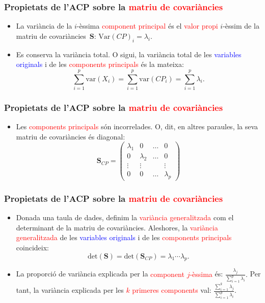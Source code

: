 \documentclass[12pt,t]{beamer}
\newcommand{\red}[1]{\textcolor{red}{#1}}
\newcommand{\blue}[1]{\textcolor{blue}{#1}}
\theoremstyle{plain}
\theoremstyle{definition}
\begin{document}
\begin{frame}
\frametitle{Propietats de l'ACP sobre la \red{matriu de covariàncies}}
\begin{itemize}
\item La variància de la $i$-èssima \red{component principal} és el \red{valor propi} $i$-èssim de la matriu de covariàncies~$\mathbf{S}$: $\mbox{Var} (CP)_i =\lambda_i.$
\item Es conserva la variància total. O sigui, la variància total de les \blue{variables originals} i de les \red{components principals} és la mateixa:
\[
\sum_{i=1}^p \mbox{var}(X_i) = \sum_{i=1}^p \mbox{var}(CP_i) =\sum_{i=1}^p\lambda_i.
\]

\end{itemize}
\end{frame}

\begin{frame}
\frametitle{Propietats de l'ACP sobre la \red{matriu de covariàncies}}
\begin{itemize}
\item Les \red{components principals} són incorrelades. O, dit, en altres paraules, la seva matriu de covariàncies és diagonal:
$$\mathbf{S}_{CP}=\left(\begin{array}{cccc}
\lambda_1& 0 &\ldots &  0\\
0& \lambda_{2}&\ldots & 0\\
\vdots & \vdots & & \vdots\\
0 & 0&\ldots &  \lambda_{p}
\end{array}
\right)$$

\end{itemize}
\end{frame}


\begin{frame}
\frametitle{Propietats de l'ACP sobre la \red{matriu de covariàncies}}
{\small
\begin{itemize}
\item Donada una taula de dades, definim la \red{variància generalitzada} com el determinant de la matriu de covariàncies. Aleshores, la \red{variància generalitzada} de les \blue{variables originals} i de les \red{components principals} coincideix:
\[
\mbox{det}(\mathbf{S}) =\mbox{det}(\mathbf{S}_{CP}) =\lambda_1\cdots \lambda_p.
\]
\item La proporció de variància explicada per la \red{component $j$-èssima} és: $\frac{\lambda_j}{\sum_{i=1}^p\lambda_i}.$ Per tant, la variància explicada per les \red{$k$ primeres components} val: $\frac{\sum_{i=1}^k\lambda_j}{\sum_{i=1}^p\lambda_i}.$

\end{itemize}
}
\end{frame}
\end{document}
